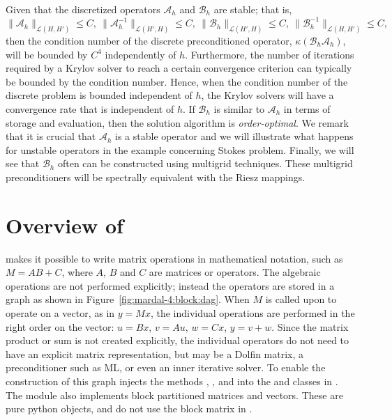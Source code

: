 Given that the discretized operators  $\mathcal{A}_h$ and $\mathcal{B}_h$ are stable; that is,
 \begin{equation}
\|\mathcal{A}_h\|_{\mathcal{L} (H, H')} \le C, \ \|\mathcal{A}_h^{-1}\|_{\mathcal{L} (H', H)} \le C, \
\|\mathcal{B}_h\|_{\mathcal{L}(H', H)} \le C,  \  \|\mathcal{B}_h^{-1}\|_{\mathcal{L}(H, H')} \le C,
\end{equation}
then the condition number of the discrete preconditioned operator,
$\kappa(\mathcal{B}_h \mathcal{A}_h)$, will be bounded by $C^4$
independently of $h$.  Furthermore, the number of iterations required
by a Krylov solver to reach a certain convergence criterion can
typically be bounded by the condition number. Hence, when the
condition number of the discrete problem is bounded independent of
$h$, the Krylov solvers will have a convergence rate that is
independent of $h$.  If $\mathcal{B}_h$ is similar to $\mathcal{A}_h$
in terms of storage and evaluation, then the solution algorithm
is \emph{order-optimal}.  We remark that it is crucial that
$\mathcal{A}_h$ is a stable operator and we will illustrate what
happens for unstable operators in the example concerning Stokes
problem.  Finally, we will see that $\mathcal{B}_h$ often can be
constructed using multigrid techniques. These multigrid
preconditioners will be spectrally equivalent with the Riesz mappings.

\section{Overview of }

 makes it possible to write matrix operations in mathematical notation, such as $M = A B+C$, where $A$, $B$ and $C$ are matrices or operators. The algebraic operations are not performed explicitly; instead the operators are stored in a graph as shown in Figure~\ref{fig:mardal-4:block:dag}. When $M$ is called upon to operate on a vector, as in $y=Mx$, the individual operations are performed in the right order on the vector: $u=Bx$, $v=Au$, $w=Cx$, $y=v+w$. Since the matrix product or sum is not created explicitly, the individual operators do not need to have an explicit matrix representation, but  may be a Dolfin matrix, a preconditioner such as ML, or even an inner iterative solver.
To enable the construction of this graph \emp{cbc.block} injects the
methods \emp{\_\_mul\_\_}, \emp{\_\_add\_\_}, and \emp{\_\_sub\_\_}
into the \emp{Matrix} and \emp{Vector} classes in \dolfin.  The module
also implements block partitioned matrices and vectors. These are pure
python objects, and do not use the block matrix in \dolfin.


